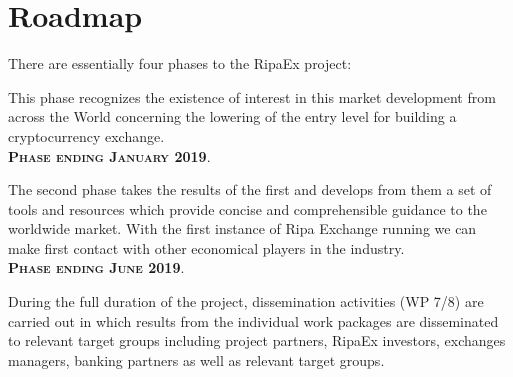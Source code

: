 \documentclass[11pt,fleqn,oneside]{book} %
\begin{document}
\section{Roadmap}
There are essentially four phases to the RipaEx project:
\begin{center}
	\begin{tcolorbox}[roadmapBox,
		title=\textbf{\textsc{Funding the project: XPX PreSale and RIPA TEC (WP2)}}]

		This phase recognizes the existence of interest in this market development
		from across the World concerning the lowering of the entry level for building a cryptocurrency exchange.\\
		\vspace{1cm}
		\centering\textbf{\textsc{Phase ending January 2019}}.
	\end{tcolorbox}
	\resizebox{0.05\textwidth}{26pt}{$\Downarrow$}
	\begin{tcolorbox}[roadmapBox,
		title=\textbf{\textsc{First exchange opening and development of tools and resources (WP3)}}]

		The second phase takes the results of the first 
		and develops from them a set of tools and resources which provide concise and comprehensible guidance to the worldwide market. 
		With the first instance of Ripa Exchange running we can make first contact with other economical players in the industry.\\
		\vspace{1cm}
		\centering\textbf{\textsc{Phase ending June 2019}}.
	\end{tcolorbox}
	\resizebox{0.05\textwidth}{26pt}{$\Downarrow$}
	\begin{tcolorbox}[roadmapBox,
		title=\textbf{\textsc{Dissemination (WP 7/8) and Project Coordination (WP1)}}]

		During the full duration of the project, 
		dissemination activities (WP 7/8) are carried out in which results from the individual work packages are disseminated 
		to relevant target groups including project partners, RipaEx investors, exchanges managers, banking partners as well 
		as relevant target groups.
	\end{tcolorbox}
	\resizebox{0.05\textwidth}{26pt}{$\Downarrow$}
	\begin{tcolorbox}[roadmapBox,
		title=\textbf{\textsc{Development of hybrid-decentralized exchange (WP 4-6)}}]


\end{tcolorbox}
\end{center}
\end{document}
